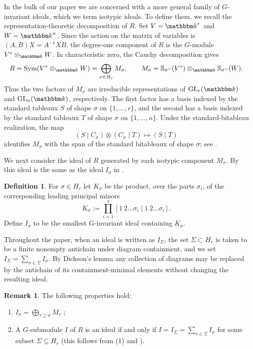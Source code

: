 \documentclass[11pt, reqno]{amsart}
\numberwithin{equation}{section}
\theoremstyle{definition}
\newtheorem{definition}[theorem]{Definition}
\newtheorem{remark}[theorem]{Remark}
\DeclareMathOperator{\GL}{GL}
\newcommand{\kk}{{\mathbbm k}}
\newcommand{\s}{\sigma}
\begin{document}
In the bulk of our paper we are concerned with a more general family of $G$-invariant ideals, which we term isotypic ideals. To define them, we recall the representation-theoretic decomposition of $R$. Set $V=\kk^r$ and $W=\kk^n$. Since the action on the matrix of variables is $(A,B)X=A^{-1}XB$, the degree-one component of $R$ is the $G$-module $V^*\otimes_\kk W$. In characteristic zero, the Cauchy decomposition \cite[Corollary 2.3.3]{Weyman} gives
\[
R=\operatorname{Sym}(V^*\otimes_\kk W)
=\bigoplus_{\sigma\in H_r}M_\sigma,
\qquad
M_\sigma
=\mathbb S_{\sigma^\vee}(V^*)\otimes_\kk
  \mathbb S_{\sigma^\vee}(W).
\]
Thus the two factors of $M_\sigma$ are irreducible representations of $\GL_r(\kk)$ and $\GL_n(\kk)$, respectively. The first factor has a basis indexed by the standard tableaux $S$ of shape $\sigma$ on $\{1,\ldots,r\}$, and the second has a basis indexed by the standard tableaux $T$ of shape $\sigma$ on $\{1,\ldots,n\}$. Under the standard-bitableau realization, the map
\[
(S\mid C_\sigma)\otimes(C_\sigma\mid T)\longmapsto(S\mid T)
\]
identifies $M_\sigma$ with the span of the standard bitableaux of shape $\sigma$; see \cite[Corollary 3.4~(2)]{deconcini1980young}.

We next consider the ideal of $R$ generated by each isotypic component $M_\s$. By  \cite[Corollary 3.4~(2)]{deconcini1980young} this ideal is the same as the ideal $I_\s$ in .

\begin{definition}\label{def: I_sigma}
For  $\sigma\in H_r$ let $K_\s$  be the product, over the parts $\sigma_i$, of the corresponding leading principal minors
\begin{equation}\label{eq: K}
K_\sigma:= \prod_{i=1}^s [1 \ 2 \ldots \sigma_i \mid 1 \ 2 \ldots \sigma_i].
\end{equation}
Define $I_\sigma$ to be the smallest G-invariant ideal containing $K_\sigma$.

Throughout the paper, when an ideal is written as $I_\Sigma$, the set $\Sigma\subset H_r$ is taken to be a finite nonempty antichain under diagram containment, and we set $I_\Sigma=\sum_{\s\in\Sigma}I_\s$. By Dickson's lemma any collection of diagrams may be replaced by the antichain of its containment-minimal elements without changing the resulting ideal.
\end{definition}

\begin{remark}\label{rem: G-invariant}
The following properties hold:
\begin{enumerate}
\item $I_\s=\bigoplus_{\tau\supseteq\s}M_\tau$ \cite[Theorem 4.1]{deconcini1980young};
\item A $G$-submodule $I$ of $R$ is an ideal if and only if $I=I_\Sigma=\sum_{ \s\in \Sigma} I_\s$ for some subset $\Sigma\subseteq H_r$ (this follows from (1) and \cite[Corollary 4.2]{deconcini1980young}).
\end{enumerate}
\end{remark}
\end{document}
